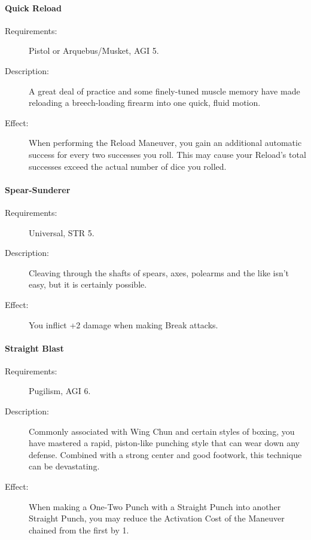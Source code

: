\documentclass[oneside,11pt,english]{book}
\begin{document}
\paragraph{\label{talent:Quick Reload}Quick Reload}
	\begin{description}
		\item [Requirements:] Pistol or Arquebus/Musket, AGI 5. 
		\item [Description:] A great deal of practice and some finely-tuned muscle memory have made reloading a breech-loading firearm into one quick, fluid motion. 
		\item [Effect:] When performing the Reload Maneuver, you gain an additional automatic success for every two successes you roll. This may cause your Reload’s total successes exceed the actual number of dice you rolled. 

	\end{description}
\paragraph{\label{talent:Spear-Sunderer}Spear-Sunderer}
	\begin{description}
		\item [Requirements:] Universal, STR 5. 
		\item [Description:] Cleaving through the shafts of spears, axes, polearms and the like isn’t easy, but it is certainly possible.
		\item [Effect:] You inflict +2 damage when making Break attacks. 

	\end{description}
\paragraph{\label{talent:Straight Blast}Straight Blast}
	\begin{description}
		\item [Requirements:] Pugilism, AGI 6. 
		\item [Description:] Commonly associated with Wing Chun and certain styles of boxing, you have mastered a rapid, piston-like punching style that can wear down any defense. Combined with a strong center and 
good footwork, this technique can be devastating. 
		\item [Effect:] When making a One-Two Punch with a Straight Punch into another Straight Punch, you may reduce the Activation Cost of the Maneuver chained from the first by 1. 

	\end{description}
\end{document}
